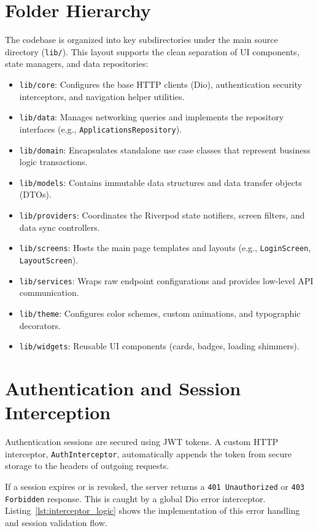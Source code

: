 \section{Folder Hierarchy}
The codebase is organized into key subdirectories under the main source directory (\texttt{lib/}). This layout supports the clean separation of UI components, state managers, and data repositories:
\begin{itemize}
    \item \texttt{lib/core}: Configures the base HTTP clients (Dio), authentication security interceptors, and navigation helper utilities.
    \item \texttt{lib/data}: Manages networking queries and implements the repository interfaces (e.g., \texttt{ApplicationsRepository}).
    \item \texttt{lib/domain}: Encapsulates standalone use case classes that represent business logic transactions.
    \item \texttt{lib/models}: Contains immutable data structures and data transfer objects (DTOs).
    \item \texttt{lib/providers}: Coordinates the Riverpod state notifiers, screen filters, and data sync controllers.
    \item \texttt{lib/screens}: Hosts the main page templates and layouts (e.g., \texttt{LoginScreen}, \texttt{LayoutScreen}).
    \item \texttt{lib/services}: Wraps raw endpoint configurations and provides low-level API communication.
    \item \texttt{lib/theme}: Configures color schemes, custom animations, and typographic decorators.
    \item \texttt{lib/widgets}: Reusable UI components (cards, badges, loading shimmers).
\end{itemize}

\section{Authentication and Session Interception}
Authentication sessions are secured using JWT tokens. A custom HTTP interceptor, \texttt{AuthInterceptor}, automatically appends the token from secure storage to the headers of outgoing requests.

If a session expires or is revoked, the server returns a \texttt{401 Unauthorized} or \texttt{403 Forbidden} response. This is caught by a global Dio error interceptor. Listing~\ref{lst:interceptor_logic} shows the implementation of this error handling and session validation flow.

